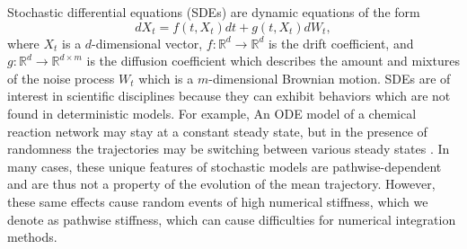 \documentclass{article}
\begin{document}
Stochastic differential equations (SDEs) are dynamic equations of
the form
\begin{equation}
dX_{t}=f(t,X_{t})dt+g(t,X_{t})dW_{t},
\end{equation}
where $X_{t}$ is a $d$-dimensional vector, $f:\mathbb{R}^{d}\rightarrow\mathbb{R}^{d}$
is the drift coefficient, and $g:\mathbb{R}^{d}\rightarrow\mathbb{R}^{d\times m}$
is the diffusion coefficient which describes the amount and mixtures
of the noise process $W_{t}$ which is a $m$-dimensional Brownian
motion. SDEs are of interest in scientific disciplines because they
can exhibit behaviors which are not found in deterministic models.
For example, An ODE model of a chemical reaction network may stay
at a constant steady state, but in the presence of randomness the
trajectories may be switching between various steady states \cite{RN3805,RN3814,RN3358}.
In many cases, these unique features of stochastic models are pathwise-dependent
and are thus not a property of the evolution of the mean trajectory.
However, these same effects cause random events of high numerical
stiffness, which we denote as pathwise stiffness, which can cause
difficulties for numerical integration methods.
\end{document}
